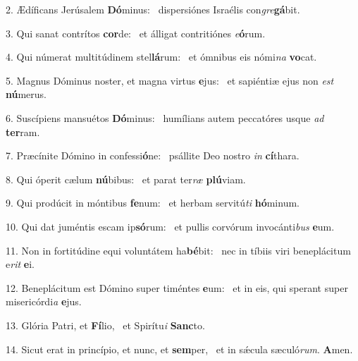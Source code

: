2. Ædíficans Jerúsalem \textbf{Dó}minus: \ast\  dispersiónes Israélis con\textit{gre}\textbf{gá}bit.\

3. Qui sanat contrítos \textbf{cor}de: \ast\  et álligat contritiónes \textit{e}\textbf{ó}rum.\

4. Qui númerat multitúdinem stel\textbf{lá}rum: \ast\  et ómnibus eis nómi\textit{na} \textbf{vo}cat.\

5. Magnus Dóminus noster, et magna virtus \textbf{e}jus: \ast\  et sapiéntiæ ejus non \textit{est} \textbf{nú}merus.\

6. Suscípiens mansuétos \textbf{Dó}minus: \ast\  humílians autem peccatóres usque \textit{ad} \textbf{ter}ram.\

7. Præcínite Dómino in confessi\textbf{ó}ne: \ast\  psállite Deo nostro \textit{in} \textbf{cí}thara.\

8. Qui óperit cælum \textbf{nú}bibus: \ast\  et parat ter\textit{ræ} \textbf{plú}viam.\

9. Qui prodúcit in móntibus \textbf{fe}num: \ast\  et herbam servitú\textit{ti} \textbf{hó}minum.\

10. Qui dat juméntis escam ip\textbf{só}rum: \ast\  et pullis corvórum invocánti\textit{bus} \textbf{e}um.\

11. Non in fortitúdine equi voluntátem ha\textbf{bé}bit: \ast\  nec in tíbiis viri beneplácitum e\textit{rit} \textbf{e}i.\

12. Beneplácitum est Dómino super timéntes \textbf{e}um: \ast\  et in eis, qui sperant super misericórdi\textit{a} \textbf{e}jus.\

13. Glória Patri, et \textbf{Fí}lio, \ast\  et Spirítu\textit{i} \textbf{Sanc}to.\

14. Sicut erat in princípio, et nunc, et \textbf{sem}per, \ast\  et in sǽcula sæculó\textit{rum}. \textbf{A}men.\

